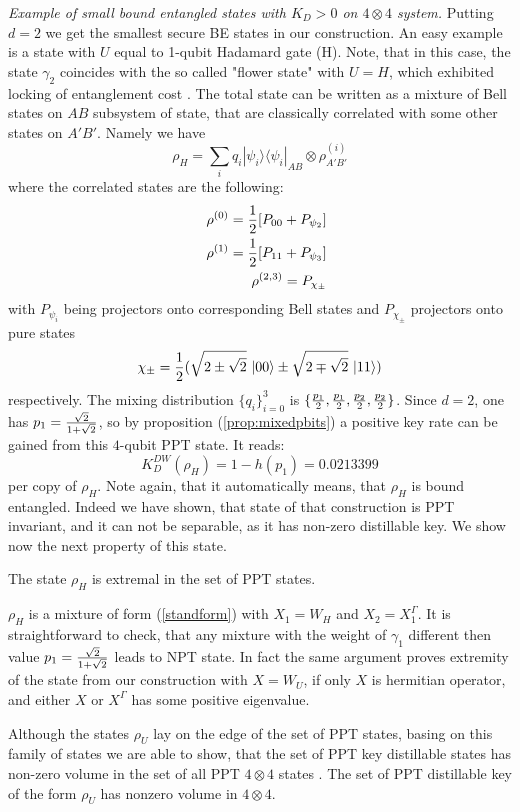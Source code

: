 \documentclass[twocolumn,prl,aps]{revtex4}
\def\be{\begin{equation}}
\def\ee{\end{equation}}
\def\ben{\begin{eqnarray}}
\def\een{\end{eqnarray}}
\def\>{\rangle}
\def\<{\langle}
\def\ot{\otimes}
\begin{document}
{\it Example of small bound entangled states with  $K_D>0$ on 
$4 \otimes 4$ system.}  Putting $d=2$ we get the smallest secure BE states in our 
construction. An easy example is a state with $U$ equal to 
1-qubit Hadamard gate (H). Note, that in this case, the state $\gamma_2$
coincides with the so called "flower state" with $U=H$, which exhibited locking of
entanglement cost \cite{lock-ent}.  The  total state can be written as a 
mixture of Bell states on $AB$ subsystem of state, that are classically correlated 
with some other states on $A'B'$. Namely we have
\be
\rho_H = \sum_{i}q_i |\psi_i\>\<\psi_i|_{AB}\ot \rho_{A'B'}^{(i)}
\label{eq:ex}
\ee
where the correlated states are the following: 
\ben
&&\rho^{(0)} = {1\over 2}[P_{00} + P_{\psi_2}] \nonumber  \\
&&\rho^{(1)} = {1\over 2}[P_{11} + P_{\psi_3}] \nonumber \\
&&\rho^{(2,3)} = P_{\chi_\pm}
\een
with $P_{\psi_i}$ being projectors onto corresponding Bell states and $P_{\chi_\pm}$ projectors onto pure states
\be
\chi_\pm ={1\over 2} (\sqrt{2 \pm  \sqrt{2}}\,\, |00\> \pm \sqrt{2 \mp \sqrt{2}}\,\,|11\> )
\ee
respectively. 
The mixing distribution $\{q_i\}_{i=0}^{3}$ is $\{ {p_1\over 2}, {p_1\over 2}, {p_2\over 2},{p_2\over 2} \}$. 
Since $d = 2$, one has $ p_1 = {\sqrt{2}\over 1 + \sqrt{2}} $, 
so by proposition (\ref{prop:mixedpbits}) a  
positive key rate can be gained from this $4$-qubit PPT state. It reads:
\be 
K_D^{DW}(\rho_H) = 1 - h(p_1) = 0.0213399
\ee 
per copy of $\rho_H$. Note again, that it automatically means, that
$\rho_H$ is bound entangled. Indeed we have shown, that state of that 
construction is PPT invariant, and it can not be separable, as it has 
non-zero distillable key.  We show now the next property of this state.

{\obs  The state $\rho_H$ is extremal in the set of PPT states. 
\label{obs:extreme}
}

$\rho_H$ is a mixture of form (\ref{standform}) 
with $X_1 =W_H$ and $X_2=X_1^{\Gamma}$. It is straightforward to check, that any
mixture with the weight of $\gamma_1$ different 
then value  $p_1 = {\sqrt{2}\over 1 + \sqrt{2}}$ leads to NPT state. In fact the 
same argument proves extremity  of the state from our construction with $X=W_U$, 
if only $X$ is hermitian operator, and either  $X$ or $X^{\Gamma}$ has some 
positive eigenvalue.

Although the states $\rho_U$ lay on the edge of the set of PPT states, 
basing on this family of states 
we are able to show, that the set of PPT key distillable states has non-zero
volume in the set of all PPT $4\ot 4$ states . 
{\obs The set of PPT distillable key of the form $\rho_U$ has 
nonzero volume in $4\ot 4$.
\label{obs:nonzero}
}
\end{document}
